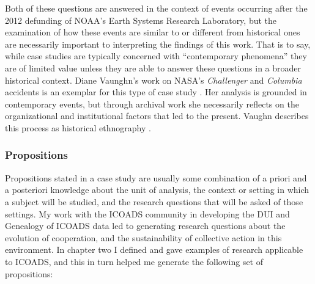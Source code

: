 \documentclass[thesis,tocnosub,noragright,centerchapter,12pt]{uiucecethesis09}
\begin{document}
{Both of these questions are answered in the context of events occurring
after the 2012 defunding of NOAA's Earth Systems Research Laboratory,
but the examination of how these events are similar to or different from
historical ones are necessarily important to interpreting the findings
of this work. That is to say, while case studies are typically concerned
with ``contemporary phenomena'' they are of limited value unless they are able to answer
these questions in a broader historical context.
Diane Vaunghn's work on NASA's \emph{Challenger} and \emph{Columbia}
accidents is an exemplar for this type of case study \citeyear{vaughan1996challenger, vaughan1999role}. Her analysis is
grounded in contemporary events, but through archival work she necessarily
reflects on the organizational and institutional factors that led to the
present. Vaughn describes this process as historical ethnography \citep{vaughan2006nasa}.\\

\subsubsection*{Propositions}

Propositions stated in a case study are usually some combination of a
priori and a posteriori knowledge about the unit of analysis, the
context or setting in which a subject will be studied, and the research questions that
will be asked of those settings. My work with the ICOADS community in
developing the DUI and Genealogy of ICOADS data led to generating
research questions about the evolution of cooperation, and the
sustainability of collective action in this environment. In chapter two
I defined and gave examples of research applicable to ICOADS,
and this in turn helped me generate the following set of propositions:\\

}
\end{document}
